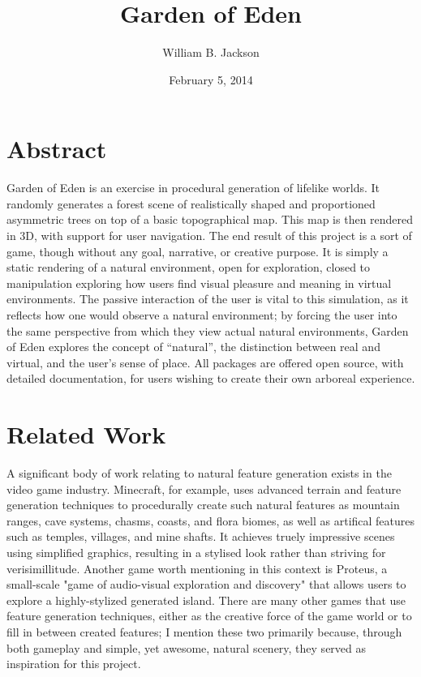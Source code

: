 \documentclass{article}
\title{Garden of Eden}
\author{William B. Jackson}
\date{February 5, 2014}
\newcommand{\tab}{\hspace*{2em}}
\begin{document}
    \maketitle
    \section{Abstract} %
    \tab Garden of Eden is an exercise in procedural generation of lifelike worlds. It randomly
generates a forest scene of realistically shaped and proportioned asymmetric trees on top of a
basic topographical map. This map is then rendered in 3D, with support for user navigation. The end
result of this project is a sort of game, though without any goal, narrative, or creative purpose.
It is simply a static rendering of a natural environment, open for exploration, closed to
manipulation exploring how users find visual pleasure and meaning in virtual environments. The
passive interaction of the user is vital to this simulation, as it reflects how one would observe a
natural environment; by forcing the user into the same perspective from which they view actual
natural environments, Garden of Eden explores the concept of “natural”, the distinction between
real and virtual, and the user's sense of place. All packages are offered open source, with
detailed documentation, for users wishing to create their own arboreal experience.
 

    \section{Related Work}
    \tab A significant body of work relating to natural feature generation exists in the video game
industry. Minecraft\cite{minecraft}, for example, uses advanced terrain and feature generation
techniques to procedurally create such natural features as mountain ranges, cave systems, chasms,
coasts, and flora biomes, as well as artifical features such as temples, villages, and mine shafts.
It achieves truely impressive scenes using simplified graphics, resulting in a stylised look rather
than striving for verisimillitude. Another game worth mentioning in this context is
Proteus\cite{proteus}, a small-scale "game of audio-visual exploration and discovery" that allows
users to explore a highly-stylized generated island. There are many other games that use feature
generation techniques, either as the creative force of the game world or to fill in between created
features; I mention these two primarily because, through both gameplay and simple, yet awesome,
natural scenery, they served as inspiration for this project.
\end{document}
